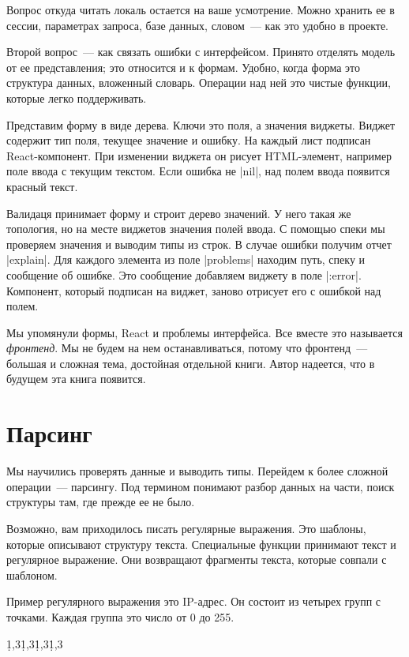 Вопрос откуда читать локаль остается на ваше усмотрение. Можно хранить ее в
сессии, параметрах запроса, базе данных, словом~--- как это удобно в проекте.

Второй вопрос~--- как связать ошибки с интерфейсом. Принято отделять модель от
ее представления; это относится и к формам. Удобно, когда форма это структура
данных, вложенный словарь. Операции над ней это чистые функции, которые легко
поддерживать.

Представим форму в виде дерева. Ключи это поля, а значения виджеты. Виджет
содержит тип поля, текущее значение и ошибку. На каждый лист подписан
React-компонент. При изменении виджета он рисует HTML-элемент, например поле
ввода с текущим текстом. Если ошибка не \spverb|nil|, над полем ввода появится
красный текст.

Валидаця принимает форму и строит дерево значений. У него такая же топология, но
на месте виджетов значения полей ввода. С помощью спеки мы проверяем значения и
выводим типы из строк. В случае ошибки получим отчет \spverb|explain|. Для
каждого элемента из поле \spverb|problems| находим путь, спеку и сообщение об
ошибке. Это сообщение добавляем виджету в поле \spverb|:error|. Компонент,
который подписан на виджет, заново отрисует его с ошибкой над полем.

Мы упомянули формы, React и проблемы интерфейса. Все вместе это называется
\emph{фронтенд}. Мы не будем на нем останавливаться, потому что фронтенд~---
большая и сложная тема, достойная отдельной книги. Автор надеется, что в будущем
эта книга появится.

\section{Парсинг}

Мы научились проверять данные и выводить типы. Перейдем к более сложной
операции~--- парсингу. Под термином понимают разбор данных на части, поиск
структуры там, где прежде ее не было.

Возможно, вам приходилось писать регулярные выражения. Это шаблоны, которые
описывают структуру текста. Специальные функции принимают текст и регулярное
выражение. Они возвращают фрагменты текста, которые совпали с шаблоном.

Пример регулярного выражения это IP-адрес. Он состоит из четырех групп с
точками. Каждая группа это число от 0 до 255.

\begin{english}
  \begin{text}
\d{1,3}\.\d{1,3}\.\d{1,3}\.\d{1,3}
  \end{text}
\end{english}

